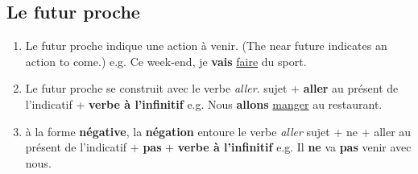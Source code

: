 \documentclass[10pt,a4paper,twoside]{article} %
\begin{document}
\subsection*{Le futur proche}
\begin{enumerate}
    \item Le futur proche indique une action à venir. (The near future indicates an action to come.) \newline
    e.g. Ce week-end, je \textbf{vais} \underline{faire} du sport.
    \item Le futur proche se construit avec le verbe \textit{aller}. \newline
    sujet + \textbf{aller} au présent de l'indicatif + \textbf{verbe à l'infinitif} \newline
    e.g. Nous \textbf{allons} \underline{manger} au restaurant.
    \item à la forme \textbf{négative}, la \textbf{négation} entoure le verbe \textit{aller} \newline
    sujet + ne + aller au présent de l'indicatif + \textbf{pas} + \textbf{verbe à l'infinitif} \newline
    e.g. Il \textbf{ne} va \textbf{pas} venir avec nous.
\end{enumerate}
\end{document}
